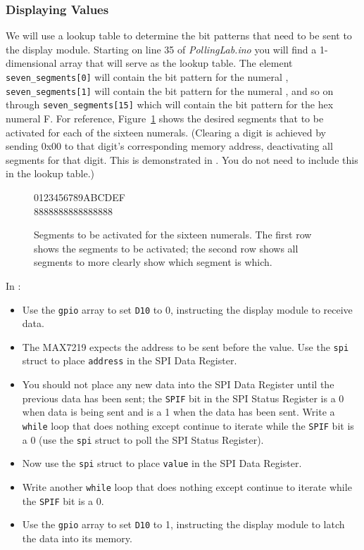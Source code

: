 \subsubsection{Displaying Values}

We will use a lookup table to determine the bit patterns that need to be sent
to the display module. Starting on line 35 of \textit{PollingLab.ino} you will
find a 1-dimensional array that will serve as the lookup table. The element
\lstinline{seven_segments[0]} will contain the bit pattern for the numeral
{},  \lstinline{seven_segments[1]} will contain the bit pattern for
the numeral {}, and so on through  \lstinline{seven_segments[15]}
which will contain the bit pattern for the hex numeral {\dviiseg F}. For
reference, Figure~\ref{fig:SevenSegmentNumerals} shows the desired segments
that to be activated for each of the sixteen numerals. (Clearing a digit is
achieved by sending 0x00 to that digit's corresponding memory address,
deactivating all segments for that digit. This is demonstrated in
. You do not need to include this in the
lookup table.)

\begin{figure}
    \centering
    {\dviiseg \huge 0123456789ABCDEF \\ \vspace{0.1cm}
                   8888888888888888}
    \caption{Segments to be activated for the sixteen numerals. The first row shows the segments to be activated; the second row shows all segments to more clearly show which segment is which. \label{fig:SevenSegmentNumerals}}
\end{figure}

In :
    \begin{itemize}
    \item Use the \lstinline{gpio} array to set \texttt{D10} to 0, instructing
        the display module to receive data.
    \item The MAX7219 expects the address to be sent before the value. Use the
        \lstinline{spi} struct to place \lstinline{address} in the SPI Data
        Register.
    \item You should not place any new data into the SPI Data Register until
        the previous data has been sent; the \texttt{SPIF} bit in the SPI
        Status Register is a 0 when data is being sent and is a 1 when the data
        has been sent. Write a \lstinline{while} loop that does nothing except
        continue to iterate while the \texttt{SPIF} bit is a 0 (use the
        \lstinline{spi} struct to poll the SPI Status Register).
    \item Now use the \lstinline{spi} struct to place \lstinline{value} in the
        SPI Data Register.
    \item Write another \lstinline{while} loop that does nothing except
        continue to iterate while the \texttt{SPIF} bit is a 0.
    \item Use the \lstinline{gpio} array to set \texttt{D10} to 1, instructing
        the display module to latch the data into its memory.
    \end{itemize}

